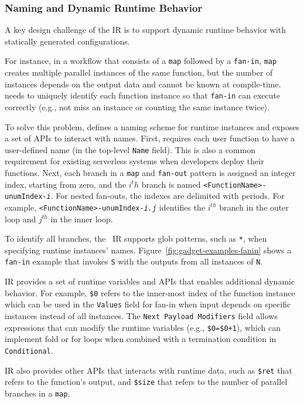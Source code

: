 \subsubsection{Naming and Dynamic Runtime Behavior}\label{sec:ir:naming}

A key design challenge of the \name{} IR is to support dynamic runtime
behavior with statically generated configurations.

For instance, in a workflow that consists of a \texttt{map} followed by a
\texttt{fan-in}, \texttt{map} creates multiple parallel instances of the same
function, but the number of instances depends on the output data and cannot be
known at compile-time. \name{} needs to uniquely identify each function
instance so that \texttt{fan-in} can execute correctly (e.g., not miss an
instance or counting the same instance twice).

To solve this problem, \name{} defines a naming scheme for runtime instances
and exposes a set of APIs to interact with names. First,
\name{} requires each user function to have a user-defined name (in the
top-level \texttt{Name} field). This is also a common requirement for existing
serverless systems when developers deploy their functions. Next, each branch
in a \texttt{map} and \texttt{fan-out} pattern is assigned an integer index,
starting from zero, and the $i^th$ branch is named
\texttt{<FunctionName>-unumIndex-\emph{i}}. For nested fan-outs, the indexes
are delimited with periods. For example,
\texttt{<FunctionName>-unumIndex-\emph{i.j}} identifies the $i^{th}$ branch in
the outer loop and $j^{th}$ in the inner loop.

To identify all branches, the \name{}~IR supports glob patterns, such as
\texttt{*}, when specifying runtime instances' names.
Figure~\ref{fig:gadget-examples-fanin} shows a \texttt{fan-in} example that
invokes \texttt{S} with the outputs from all instances of \texttt{N}.

\name{} IR provides a set of runtime variables and APIs that enables
additional dynamic behavior. For example, \texttt{\$0} refers to the
inner-most index of the function instance which can be used in the
\texttt{Values} field for fan-in when input depends on specific instances
instead of all instances. The \texttt{Next Payload Modifiers} field allows
expressions that can modify the runtime variables (e.g., \texttt{\$0=\$0+1}),
which can implement fold or for loops when combined with a termination
condition in \texttt{Conditional}.


\name{} IR also provides other APIs that interacts with runtime data, such as
\texttt{\$ret} that refers to the function's output, and \texttt{\$size} that
refers to the number of parallel branches in a \texttt{map}.
